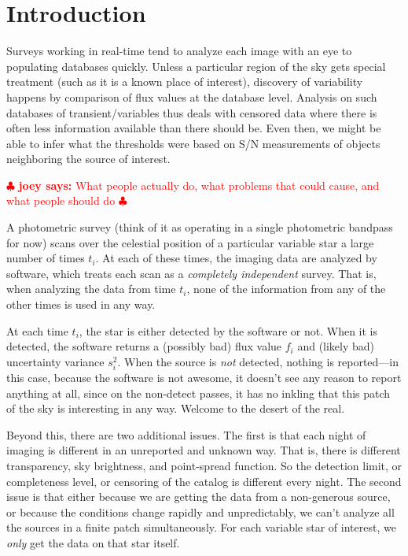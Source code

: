 \documentclass[12pt,preprint]{aastex}
\newcommand{\joey}[1] { \textcolor{red} {
\ensuremath{\clubsuit} {\bf joey says:}  {#1}
\ensuremath{\clubsuit} } }%
\begin{document}

\section{Introduction}
\label{sec:intro}

Surveys working in real-time tend to analyze each image with an eye to populating databases quickly. Unless a particular region of the sky gets special treatment (such as it is a known place of interest), discovery of variability happens by comparison of flux values at the database level. Analysis on such databases of transient/variables thus deals with censored data where there is often less information available than there should be. Even then, we might be able to infer what the thresholds were based on S/N measurements of objects neighboring the source of interest.

\joey{What people actually do, what problems that could cause, and what people should do}

A photometric survey (think of it as operating in a single photometric
bandpass for now) scans over the celestial position of a particular
variable star  a large number of times $t_i$.  At each of these
times, the imaging data are analyzed by software, which
treats each scan as a \emph{completely independent} survey.  That is,
when analyzing the data from time $t_i$, none of the information from
any of the other times is used in any way.

At each time $t_i$, the star is either detected by the
software or not.  When it is detected, the software returns
a (possibly bad) flux value $f_i$ and (likely bad) uncertainty
variance $s_i^2$.  When the source is \emph{not} detected,
nothing is reported---in this case, because the software is not
awesome, it doesn't see any reason to report anything at all, since on
the non-detect passes, it has no inkling that this patch of the sky is
interesting in any way.  Welcome to the desert of the real.

Beyond this, there are two additional issues.  The first is that each
night of imaging is different in an unreported and unknown way.  That
is, there is different transparency, sky brightness, and point-spread
function.  So the detection limit, or completeness level, or censoring
of the catalog is different every night.  The second issue is that
either because we are getting the data from a non-generous source, or
because the conditions change rapidly and unpredictably, we can't
analyze all the sources in a finite patch simultaneously.  For each
variable star of interest, we \emph{only} get the data on that star
itself.
\end{document}
